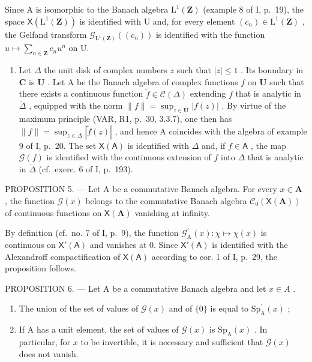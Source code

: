 Since A is isomorphic to the Banach algebra \(\mathrm{L}^{1}(\mathbf{Z})\) (example 8 of I, p.~19), the space \(\mathsf{X}(\mathrm{L}^{1}(\mathbf{Z}))\) is identified with U and, for every element \((c_{n})\in\mathrm{L}^{1}(\mathbf{Z})\) , the Gelfand transform \(\mathcal{G}_{\mathrm{L}^{1}(\mathbf{Z})}((c_{n}))\) is identified with the function \(u\mapsto\sum_{n\in\mathbf{Z}}c_{n}u^{n}\) on U.

\begin{enumerate}
\def\labelenumi{\arabic{enumi})}
\setcounter{enumi}{4}
\tightlist
\item
  Let \(\Delta\) the unit disk of complex numbers \(z\) such that \(|z| \leqslant 1\) . Its boundary in \(\mathbf{C}\) is \(\mathbf{U}\) . Let A be the Banach algebra of complex functions \(f\) on \(\mathbf{U}\) such that there exists a continuous function \(\widetilde{f} \in \mathcal{C}(\Delta)\) extending \(f\) that is analytic in \(\mathring{\Delta}\) , equipped with the norm \(\|f\| = \sup_{z \in \mathbf{U}} |f(z)|\) . By virtue of the maximum principle (VAR, R1, p.~30, 3.3.7), one then has \(\|f\| = \sup_{z \in \Delta} |\widetilde{f}(z)|\) , and hence A coincides with the algebra of example 9 of I, p.~20. The set \(\mathsf{X}(\mathsf{A})\) is identified with \(\Delta\) and, if \(f \in \mathsf{A}\) , the map \(\mathcal{G}(f)\) is identified with the continuous extension of \(f\) into \(\Delta\) that is analytic in \(\mathring{\Delta}\) (cf.~exerc. 6 of I, p.~193).
\end{enumerate}

PROPOSITION 5. --- Let A be a commutative Banach algebra. For every \(x \in \mathbf{A}\) , the function \(\mathcal{G}(x)\) belongs to the commutative Banach algebra \(\mathcal{C}_0(\mathsf{X}(\mathbf{A}))\) of continuous functions on \(\mathsf{X}(\mathbf{A})\) vanishing at infinity.

By definition (cf.~no. 7 of I, p.~9), the function \(\mathcal{G}_{\mathrm{A}}^{\prime}(x)\colon \chi \mapsto \chi (x)\) is continuous on \(\mathsf{X}'(\mathsf{A})\) and vanishes at 0. Since \(\mathsf{X}'(\mathsf{A})\) is identified with the Alexandroff compactification of \(\mathsf{X}(\mathsf{A})\) according to cor. 1 of I, p.~29, the proposition follows.

PROPOSITION 6. --- Let A be a commutative Banach algebra and let \(x \in A\) .

\begin{enumerate}
\def\labelenumi{\alph{enumi})}
\item
  The union of the set of values of \(\mathcal{G}(x)\) and of \(\{0\}\) is equal to \(\mathrm{Sp}_{\mathrm{A}}^{\prime}(x)\) ;
\item
  If A has a unit element, the set of values of \(\mathcal{G}(x)\) is \(\mathrm{Sp}_{\mathrm{A}}(x)\) . In particular, for \(x\) to be invertible, it is necessary and sufficient that \(\mathcal{G}(x)\) does not vanish.
\end{enumerate}

